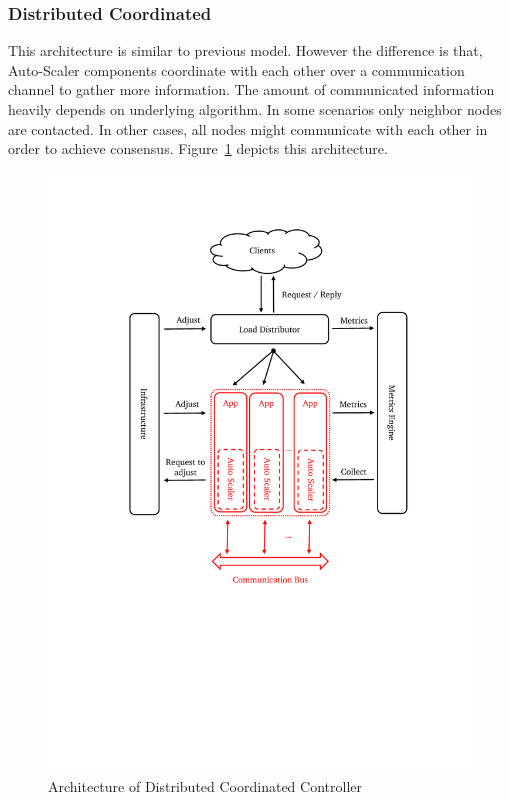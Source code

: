 \subsubsection{Distributed Coordinated}
This architecture is similar to previous model. However the difference is that, Auto-Scaler components coordinate with each other over a communication channel to gather more information. The amount of communicated information heavily depends on underlying algorithm. In some scenarios only neighbor nodes are contacted. In other cases, all nodes might communicate with each other in order to achieve consensus. Figure~\ref{fig:auto-scaler-dist-coord} depicts this architecture.
\begin{figure}[!htbp]
    \includegraphics[clip, trim=3cm 9cm 2.5cm 2.5cm]{auto-scaler-dist-coord.pdf}
    \centering
    \caption{Architecture of Distributed Coordinated Controller}
    \label{fig:auto-scaler-dist-coord}
\end{figure}
\clearpage
